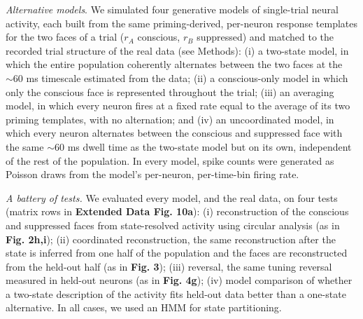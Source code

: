 \documentclass{article}
\begin{document}
\textit{Alternative models}. We simulated four generative models of single-trial neural activity, each built from the same priming-derived, per-neuron response templates for the two faces of a trial ($r_A$ conscious, $r_B$ suppressed) and matched to the recorded trial structure of the real data (see Methods): (i) a two-state model, in which the entire population coherently alternates between the two faces at the ${\sim}60$ ms timescale estimated from the data; (ii) a conscious-only model in which only the conscious face is represented throughout the trial; (iii) an averaging model, in which every neuron fires at a fixed rate equal to the average of its two priming templates, with no alternation; and (iv) an uncoordinated model, in which every neuron alternates between the conscious and suppressed face with the same ${\sim}60$ ms dwell time as the two-state model but on its own, independent of the rest of the population. In every model, spike counts were generated as Poisson draws from the model's per-neuron, per-time-bin firing rate.

\textit{A battery of tests.} We evaluated every model, and the real data, on four tests (matrix rows in \textbf{Extended Data Fig. 10a}): (i) reconstruction of the conscious and suppressed faces from state-resolved activity using circular analysis (as in \textbf{Fig. 2h,i}); (ii) coordinated reconstruction, the same reconstruction after the state is inferred from one half of the population and the faces are reconstructed from the held-out half (as in \textbf{Fig. 3}); (iii) reversal, the same tuning reversal measured in held-out neurons (as in \textbf{Fig. 4g}); (iv) model comparison of whether a two-state description of the activity fits held-out data better than a one-state alternative. In all cases, we used an HMM for state partitioning.
\end{document}
